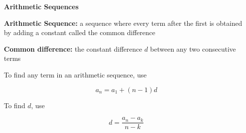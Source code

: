 \begin{center}
\textbf{Arithmetic Sequences}
\end{center}

\vspace*{1ex}

\textbf{Arithmetic Sequence:} a sequence where every term after the first is obtained by adding a constant called the common difference

\vspce

\textbf{Common difference:} the constant difference $d$ between any two consecutive terms

\vspce

To  find  any  term  in  an  arithmetic sequence, use

$$a_{n} = a_{1} + (n - 1)d$$

To  find  $d$, use

$$d = \displaystyle \frac{a_{n} - a_{k}}{n - k} $$

